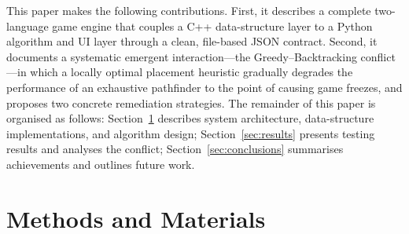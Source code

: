 \documentclass[conference]{IEEEtran}
\begin{document}
This paper makes the following contributions.
First, it describes a complete two-language game engine that couples a C++
data-structure layer to a Python algorithm and UI layer through a clean,
file-based JSON contract.
Second, it documents a systematic emergent interaction—the Greedy–Backtracking
conflict—in which a locally optimal placement heuristic gradually degrades the
performance of an exhaustive pathfinder to the point of causing game freezes,
and proposes two concrete remediation strategies.
The remainder of this paper is organised as follows: Section~\ref{sec:methods}
describes system architecture, data-structure implementations, and algorithm
design; Section~\ref{sec:results} presents testing results and analyses the
conflict; Section~\ref{sec:conclusions} summarises achievements and outlines
future work.

\section{Methods and Materials}
\label{sec:methods}
\end{document}
